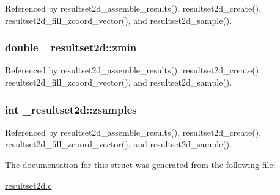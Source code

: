 Referenced by resultset2d\+\_\+assemble\+\_\+results(), resultset2d\+\_\+create(), resultset2d\+\_\+fill\+\_\+zcoord\+\_\+vector(), and resultset2d\+\_\+sample().

\subsubsection[{\texorpdfstring{zmin}{zmin}}]{\setlength{\rightskip}{0pt plus 5cm}double \+\_\+resultset2d\+::zmin}\hypertarget{struct__resultset2d_a7f406b61e406be2ac8c2c2b14097055e}{}\label{struct__resultset2d_a7f406b61e406be2ac8c2c2b14097055e}


Referenced by resultset2d\+\_\+assemble\+\_\+results(), resultset2d\+\_\+create(), resultset2d\+\_\+fill\+\_\+zcoord\+\_\+vector(), and resultset2d\+\_\+sample().

\subsubsection[{\texorpdfstring{zsamples}{zsamples}}]{\setlength{\rightskip}{0pt plus 5cm}int \+\_\+resultset2d\+::zsamples}\hypertarget{struct__resultset2d_a3c7d9b5681c8ef831cefe6c1b6094114}{}\label{struct__resultset2d_a3c7d9b5681c8ef831cefe6c1b6094114}


Referenced by resultset2d\+\_\+assemble\+\_\+results(), resultset2d\+\_\+create(), resultset2d\+\_\+fill\+\_\+zcoord\+\_\+vector(), and resultset2d\+\_\+sample().



The documentation for this struct was generated from the following file\+:\begin{DoxyCompactItemize}
\item 
\hyperlink{resultset2d_8c}{resultset2d.\+c}\end{DoxyCompactItemize}
